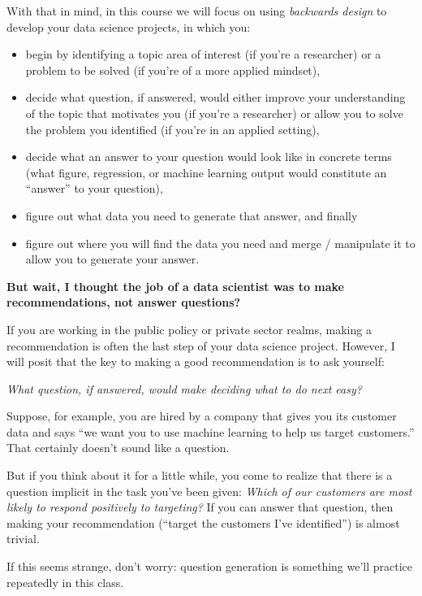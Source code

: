 \documentclass[12pt]{article}
\begin{document}
With that in mind, in this course we will focus on using \emph{backwards design} to develop your data science projects, in which you:

\begin{itemize}
	\item begin by identifying a topic area of interest (if you're a researcher) or a problem to be solved (if you're of a more applied mindset),
	\item decide what question, if answered, would either improve your understanding of the topic that motivates you (if you're a researcher) or allow you to solve the problem you identified (if you're in an applied setting),
	\item decide what an answer to your question would look like in concrete terms (what figure, regression, or machine learning output would constitute an ``answer'' to your question),
	\item figure out what data you need to generate that answer, and finally
	\item figure out where you will find the data you need and merge / manipulate it to allow you to generate your answer.
\end{itemize}

\textbf{But wait, I thought the job of a data scientist was to make recommendations, not answer questions?}

If you are working in the public policy or private sector realms, making a recommendation is often the last step of your data science project. However, I will posit that the key to making a good recommendation is to ask yourself:

\emph{What question, if answered, would make deciding what to do next easy?}

Suppose, for example, you are hired by a company that gives you its customer data and says ``we want you to use machine learning to help us target customers.'' That certainly doesn't sound like a question.

But if you think about it for a little while, you come to realize that there is a question implicit in the task you've been given: \emph{Which of our customers are most likely to respond positively to targeting?} If you can answer that question, then making your recommendation (``target the customers I've identified'') is almost trivial.

If this seems strange, don't worry: question generation is something we'll practice repeatedly in this class.

\end{document}
